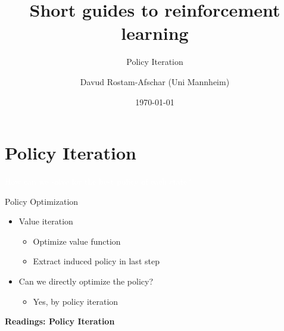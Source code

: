 \documentclass[11pt,table]{beamer}
\title[]{Short guides to reinforcement learning}
\subtitle[]{Policy Iteration}
\author[D. Rostam-Afschar]{\textcolor{gray1}{Davud Rostam-Afschar (Uni Mannheim)}}
\date[]{\today}
\begin{document}
\begin{frame}[plain]
  \titlepage
\end{frame}


\section{Policy Iteration}
{
\begin{frame}
\centering
\Huge
\textcolor{white}{How can we solve for the best policy of each state?}
\thispagestyle{empty}
\end{frame}
}


\begin{frame}{Policy Optimization}

\begin{itemize}
    \item Value iteration

    \begin{itemize}
    
\item Optimize value function
\item Extract induced policy in last step
 \end{itemize}

 \item Can we directly optimize the policy?

 \begin{itemize}
      
 
\item Yes, by policy iteration
 \end{itemize}
\end{itemize}
\vspace{5mm}

\footnotesize
\textbf{Readings: Policy Iteration}\\
\citet[][section 4.3]{sutton2018reinforcement}

\citet[][sections 6.4-6.5]{puterman2014markov}

\citet[][section 17.3]{russell2016artificial}

    
\end{frame}
\end{document}
